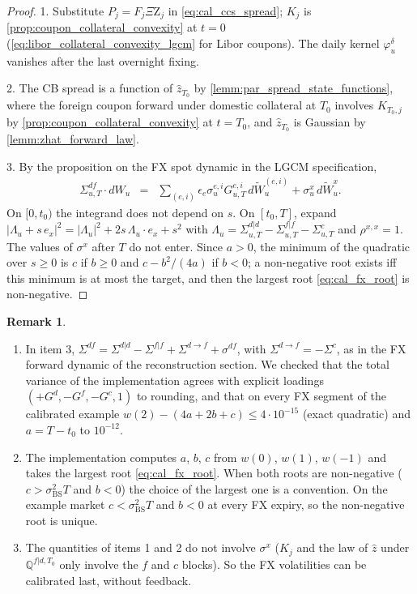 \documentclass[11pt,english]{amsart}
\newcommand{\BS}{\mathrm{BS}}
\newcommand{\QQ}{\mathbb{Q}}
\newcommand{\QZ}{{\Xi\mathrm{Z}}}
\theoremstyle{definition}
\newtheorem{rema}{Remark}
\begin{document}
\begin{proof}
1. Substitute $P_j = F_j\QZ_j$ in \eqref{eq:cal_ccs_spread}; $K_j$ is \autoref{prop:coupon_collateral_convexity} at $t=0$ (\eqref{eq:libor_collateral_convexity_lgcm} for Libor coupons). The daily kernel $\varphi^\delta_u$ vanishes after the last overnight fixing.

2. The CB spread is a function of $\hat{z}_{T_0}$ by \autoref{lemm:par_spread_state_functions}, where the foreign coupon forward under domestic collateral at $T_0$ involves $K_{T_0,j}$ by \autoref{prop:coupon_collateral_convexity} at $t = T_0$, and $\hat{z}_{T_0}$ is Gaussian by \autoref{lemm:zhat_forward_law}.

3. By the proposition on the FX spot dynamic in the LGCM specification,
\begin{eqnarray*}
  \Sigma^{df}_{u,T}\cdot dW_u &=& \sum_{(e,i)}\epsilon_e\sigma^{e,i}_uG^{e,i}_{u,T}\,d\widetilde{W}^{(e,i)}_u + \sigma^x_u\,d\widetilde{W}^x_u .
\end{eqnarray*} On $[0,t_0)$ the integrand does not depend on $s$. On $[t_0,T]$, expand $|\Lambda_u + s\,e_x|^2 = |\Lambda_u|^2 + 2s\,\Lambda_u\cdot e_x + s^2$ with $\Lambda_u = \Sigma^{d|d}_{u,T}-\Sigma^{f|f}_{u,T}-\Sigma^c_{u,T}$ and $\rho^{x,x} = 1$. The values of $\sigma^x$ after $T$ do not enter. Since $a>0$, the minimum of the quadratic over $s\ge 0$ is $c$ if $b\ge 0$ and $c - b^2/(4a)$ if $b<0$; a non-negative root exists iff this minimum is at most the target, and then the largest root \eqref{eq:cal_fx_root} is non-negative.
\end{proof}

\begin{rema}
\begin{enumerate}
\item In item 3, $\Sigma^{df} = \Sigma^{d|d} - \Sigma^{f|f} + \Sigma^{d\to f} + \sigma^{df}$, with $\Sigma^{d\to f} = -\Sigma^c$, as in the FX forward dynamic of the reconstruction section. We checked that the total variance of the implementation agrees with explicit loadings $(+G^d,-G^f,-G^c,1)$ to rounding, and that on every FX segment of the calibrated example $w(2) - (4a+2b+c) \le 4\cdot10^{-15}$ (exact quadratic) and $a = T-t_0$ to $10^{-12}$.
\item The implementation computes $a$, $b$, $c$ from $w(0)$, $w(1)$, $w(-1)$ and takes the largest root \eqref{eq:cal_fx_root}. When both roots are non-negative ($c>\sigma_\BS^2T$ and $b<0$) the choice of the largest one is a convention. On the example market $c<\sigma_\BS^2T$ and $b<0$ at every FX expiry, so the non-negative root is unique.
\item The quantities of items 1 and 2 do not involve $\sigma^x$ ($K_j$ and the law of $\hat{z}$ under $\QQ^{f|d,T_0}$ only involve the $f$ and $c$ blocks). So the FX volatilities can be calibrated last, without feedback.
\end{enumerate}
\end{rema}
\end{document}

